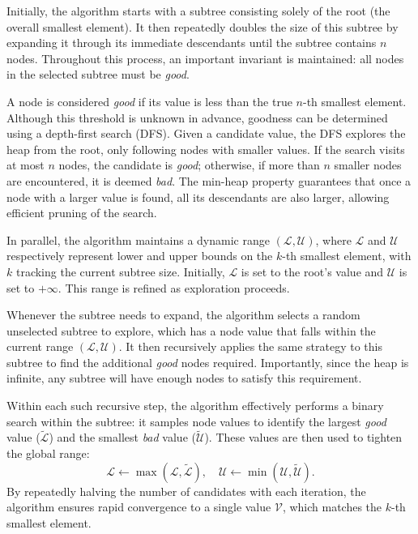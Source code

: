 \documentclass[conference]{IEEEtran}
\begin{document}
Initially, the algorithm starts with a subtree consisting solely of the root (the overall smallest element). It then repeatedly doubles the size of this subtree by expanding it through its immediate descendants until the subtree contains $n$ nodes. Throughout this process, an important invariant is maintained: all nodes in the selected subtree must be \textit{good}.

A node is considered \textit{good} if its value is less than the true $n$-th smallest element. Although this threshold is unknown in advance, goodness can be determined using a depth-first search (DFS). Given a candidate value, the DFS explores the heap from the root, only following nodes with smaller values. If the search visits at most $n$ nodes, the candidate is \textit{good}; otherwise, if more than $n$ smaller nodes are encountered, it is deemed \textit{bad}. The min-heap property guarantees that once a node with a larger value is found, all its descendants are also larger, allowing efficient pruning of the search.

In parallel, the algorithm maintains a dynamic range $(\mathcal{L}, \mathcal{U})$, where $\mathcal{L}$ and $\mathcal{U}$ respectively represent lower and upper bounds on the $k$-th smallest element, with $k$ tracking the current subtree size. Initially, $\mathcal{L}$ is set to the root's value and $\mathcal{U}$ is set to $+\infty$. This range is refined as exploration proceeds.

Whenever the subtree needs to expand, the algorithm selects a random unselected subtree to explore, which has a node value that falls within the current range $(\mathcal{L}, \mathcal{U})$. It then recursively applies the same strategy to this subtree to find the additional \textit{good} nodes required. Importantly, since the heap is infinite, any subtree will have enough nodes to satisfy this requirement.

Within each such recursive step, the algorithm effectively performs a binary search within the subtree: it samples node values to identify the largest \textit{good} value ($\tilde{\mathcal{L}}$) and the smallest \textit{bad} value ($\tilde{\mathcal{U}}$). These values are then used to tighten the global range:
\[
\mathcal{L} \leftarrow \max(\mathcal{L}, \tilde{\mathcal{L}}), \quad \mathcal{U} \leftarrow \min(\mathcal{U}, \tilde{\mathcal{U}}).
\]
By repeatedly halving the number of candidates with each iteration, the algorithm ensures rapid convergence to a single value $\mathcal{V}$, which matches the $k$-th smallest element.
\end{document}
